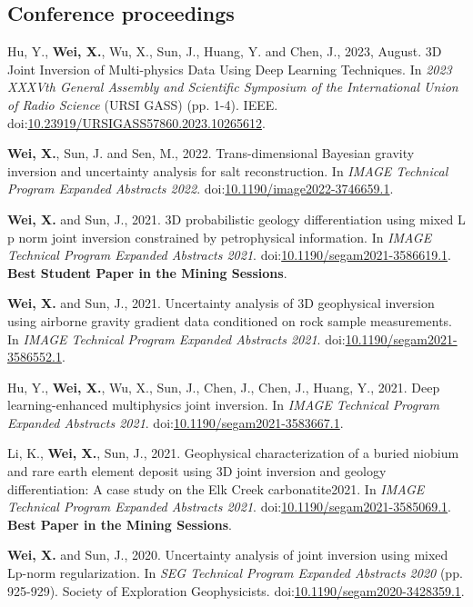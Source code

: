 \documentclass[11pt, a4paper]{article}
\newcommand{\LastName}{Wei}
\newcommand{\Initials}{X}
\newcommand{\Wei}{\textbf{\LastName, \Initials.}}  %
\newcommand{\WeiSun}{\textbf{\LastName, \Initials.} and Sun, J.}  %
\newcommand{\DOI}[1]{doi:\href{https://doi.org/#1}{#1}}
\begin{document}
\subsection*{Conference proceedings}
\begin{etaremune}
	
	\item 
	Hu, Y., \Wei, Wu, X., Sun, J., Huang, Y. and Chen, J., 2023, August. 3D Joint Inversion of Multi-physics Data Using Deep Learning Techniques. In \emph{2023 XXXVth General Assembly and Scientific Symposium of the International Union of Radio Science} (URSI GASS) (pp. 1-4). IEEE. \DOI{10.23919/URSIGASS57860.2023.10265612}.
	
	\item
	\Wei, Sun, J. and Sen, M., 2022. Trans-dimensional Bayesian gravity inversion and uncertainty analysis for salt reconstruction. In \emph{IMAGE Technical Program Expanded Abstracts 2022}.  \DOI{10.1190/image2022-3746659.1}.

	\item
	\WeiSun, 2021. 3D probabilistic geology differentiation using mixed L p norm joint inversion constrained by petrophysical information. In \emph{IMAGE Technical Program Expanded Abstracts 2021}. \DOI{10.1190/segam2021-3586619.1}. \textbf{Best Student Paper in the Mining Sessions}.

	\item
	\WeiSun, 2021. Uncertainty analysis of 3D geophysical inversion using airborne gravity gradient data conditioned on rock sample measurements. In \emph{IMAGE Technical Program Expanded Abstracts 2021}. \DOI{10.1190/segam2021-3586552.1}.

	\item
	Hu, Y., \Wei, Wu, X., Sun, J., Chen, J., Chen, J., Huang, Y., 2021. Deep learning-enhanced multiphysics joint inversion. In \emph{IMAGE Technical Program Expanded Abstracts 2021}. \DOI{10.1190/segam2021-3583667.1}.

	\item
	Li, K., \Wei, Sun, J., 2021. Geophysical characterization of a buried niobium and rare earth element deposit using 3D joint inversion and geology differentiation: A case study on the Elk Creek carbonatite2021. In \emph{IMAGE Technical Program Expanded Abstracts 2021}. \DOI{10.1190/segam2021-3585069.1}. \textbf{Best Paper in the Mining Sessions}.

	\item
	\WeiSun, 2020. Uncertainty analysis of joint inversion using mixed Lp-norm regularization. In \emph{SEG Technical Program Expanded Abstracts 2020} (pp. 925-929). Society of Exploration Geophysicists. \DOI{10.1190/segam2020-3428359.1}.


\end{etaremune}
\end{document}
